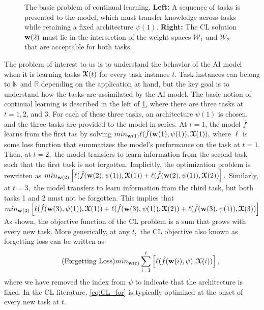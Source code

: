 \begin{figure}[t]
    \caption{The basic problem of continual learning. \textbf{Left:} A sequence of tasks is presented to the model, which must transfer knowledge across tasks while retaining a fixed architecture $\psi(1)$. \textbf{Right:} The CL solution $\boldsymbol{\mathrm{w}}(2)$ must lie in the intersection of the weight spaces $\mathcal{W}_1$ and $\mathcal{W}_2$ that are acceptable for both tasks.}
    \label{fig:CL1}
\end{figure}
The problem of interest to us is to understand the behavior of the AI model when it is learning tasks $\boldsymbol{\mathcal{X}}(t)$ for every task instance $t.$ Task instances can belong to $\mathbb{N}$ and $\mathbb{R}$ depending on the application at hand, but the key goal is to understand how the tasks are assimilated by the AI model. The basic notion of continual learning is described in the left of \cref{fig:CL1}, where there are three tasks at $t=1, 2$, and $3$. For each of these three tasks, an architecture $\psi(1)$ is chosen, and the three tasks are provided to the model in series. At $t=1$, the model $\hat{f}$ learns from the first tas by solving 
$min_{\boldsymbol{\mathrm{w}}(1)} \ell(\hat{f}(\boldsymbol{\mathrm{w}}(1), \psi(1)), \boldsymbol{\mathcal{X}}(1)),$
where $\ell$ is some loss function that summarizes the model's performance on the task at $t=1.$ Then, at $t=2,$ the model transfers to learn information from the second task such that the first task is not forgotten. Implicitly, the optimization problem is rewritten as $min_{\boldsymbol{\mathrm{w}}(2)} \left[ \ell(\hat{f}(\boldsymbol{\mathrm{w}}(2), \psi(1)), \boldsymbol{\mathcal{X}}(1)) + \ell(\hat{f}(\boldsymbol{\mathrm{w}}(2), \psi(1)), \boldsymbol{\mathcal{X}}(2)) \right].$ Similarly, at $t=3,$ the model transfers to learn information from the third task, but both tasks 1 and 2 must not be forgotten. This implies that 
$min_{\boldsymbol{\mathrm{w}}(3)} \left[ \ell(\hat{f}(\boldsymbol{\mathrm{w}}(3), \psi(1)), \boldsymbol{\mathcal{X}}(1)) + \ell(\hat{f}(\boldsymbol{\mathrm{w}}(3), \psi(1)), \boldsymbol{\mathcal{X}}(2)) + \ell(\hat{f}(\boldsymbol{\mathrm{w}}(3), \psi(1)), \boldsymbol{\mathcal{X}}(3))\right]$
As shown, the objective function of the CL problem is a sum that grows with every new task. More generically, at any $t,$ the CL objective also known as forgetting loss can be written as
\begin{align}~\label{eq:CL_for}\tag{Forgetting Loss}
    min_{\boldsymbol{\mathrm{w}}(t)} \sum_{i=1}^t \left[\ell(\hat{f}(\boldsymbol{\mathrm{w}}(i), \psi), \boldsymbol{\mathcal{X}}(i)) \right], 
\end{align}
where we have removed the index from $\psi$ to indicate that the architecture is fixed. In the CL literature, \eqref{eq:CL_for} is typically optimized at the onset of every new task at $t.$  

